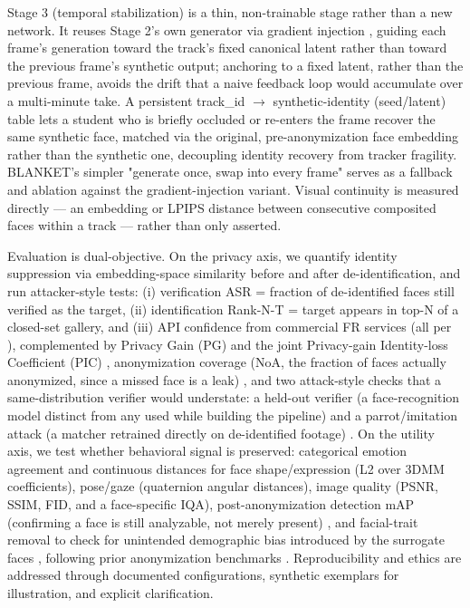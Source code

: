 \documentclass[12pt]{article}
\begin{document}
Stage 3 (temporal stabilization) is a thin, non-trainable stage rather than a new network. It reuses Stage 2's own generator via gradient injection \cite{wang}, guiding each frame's generation toward the track's fixed canonical latent rather than toward the previous frame's synthetic output; anchoring to a fixed latent, rather than the previous frame, avoids the drift that a naive feedback loop would accumulate over a multi-minute take. A persistent track\_id $\to$ synthetic-identity (seed/latent) table lets a student who is briefly occluded or re-enters the frame recover the same synthetic face, matched via the original, pre-anonymization face embedding rather than the synthetic one, decoupling identity recovery from tracker fragility. BLANKET's simpler "generate once, swap into every frame" serves as a fallback and ablation against the gradient-injection variant. Visual continuity is measured directly — an embedding or LPIPS distance between consecutive composited faces within a track — rather than only asserted.

Evaluation is dual-objective. On the privacy axis, we quantify identity suppression via embedding-space similarity before and after de-identification, and run attacker-style tests: (i) verification ASR = fraction of de-identified faces still verified as the target, (ii) identification Rank-N-T = target appears in top-N of a closed-set gallery, and (iii) API confidence from commercial FR services (all per \cite{wang}), complemented by Privacy Gain (PG) and the joint Privacy-gain Identity-loss Coefficient (PIC) \cite{meden}, anonymization coverage (NoA, the fraction of faces actually anonymized, since a missed face is a leak) \cite{klemp}, and two attack-style checks that a same-distribution verifier would understate: a held-out verifier (a face-recognition model distinct from any used while building the pipeline) and a parrot/imitation attack (a matcher retrained directly on de-identified footage) \cite{yifan-wu,meden}. On the utility axis, we test whether behavioral signal is preserved: categorical emotion agreement and continuous distances for face shape/expression (L2 over 3DMM coefficients), pose/gaze (quaternion angular distances), image quality (PSNR, SSIM, FID, and a face-specific IQA), post-anonymization detection mAP (confirming a face is still analyzable, not merely present) \cite{klemp}, and facial-trait removal to check for unintended demographic bias introduced by the surrogate faces \cite{hellmann}, following prior anonymization benchmarks \cite{wang,kung}. Reproducibility and ethics are addressed through documented configurations, synthetic exemplars for illustration, and explicit clarification.
\end{document}
